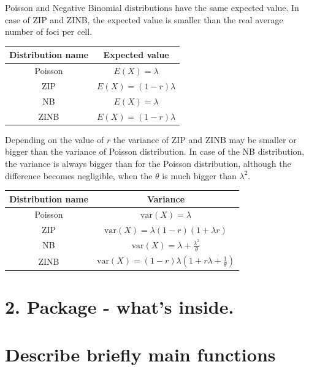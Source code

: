 Poisson and Negative Binomial distributions have the same expected value. In case of ZIP and ZINB, the expected value is smaller than the real average number of foci per cell.

\begin{center}
\begin{tabular}{ |c|c| } 
\hline
\bfseries Distribution name & \bfseries Expected value \\
\hline
Poisson & $E(X) = \lambda $ \\
\hline
ZIP & $E(X) = (1 - r) \lambda $ \\
\hline
NB & $E(X) = \lambda $ \\
\hline
ZINB & $E(X) = (1 - r)  \lambda $  \\
\hline
\end{tabular}
\end{center}

Depending on the value of $r$ the variance of ZIP and ZINB may be smaller or bigger than the variance of Poisson distribution. In case of the NB distribution, the variance is always bigger than for the Poisson distribution, although the difference becomes negligible, when the $\theta$ is much bigger than $\lambda^2$.

\begin{center}
\begin{tabular}{ |c|c| } 
\hline
\bfseries Distribution name & \bfseries Variance \\
\hline
Poisson & $\textrm{var}(X) = \lambda $ \\
\hline
ZIP & $\textrm{var}(X) = \lambda (1 - r)(1 + \lambda r)$ \\
\hline
NB & $\textrm{var}(X) = \lambda + \frac{\lambda^2}{\theta} $ \\
\hline
ZINB & $\textrm{var}(X) = (1 - r) \lambda \left( 1 + r\lambda  + \frac{1}{\theta} \right)$ \\
\hline
\end{tabular}
\end{center}


\section{2. Package - what's inside.}


\section{Describe briefly main functions}

